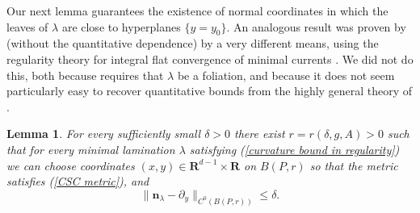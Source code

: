 \documentclass[reqno,11pt]{amsart}
\newcommand{\RR}{\mathbf{R}}
\newcommand{\normal}{\mathbf n}
\newtheorem{lemma}[theorem]{Lemma}
\theoremstyle{definition}
\numberwithin{equation}{section}
\begin{document}
Our next lemma guarantees the existence of normal coordinates in which the leaves of $\lambda$ are close to hyperplanes $\{y = y_0\}$.
An analogous result was proven by \cite{Solomon86} (without the quantitative dependence) by a very different means, using the regularity theory for integral flat convergence of minimal currents \cite[Theorem 5.3.14]{federer2014geometric}.
We did not do this, both because \cite{Solomon86} requires that $\lambda$ be a foliation, and because it does not seem particularly easy to recover quantitative bounds from the highly general theory of \cite[Chapter 5]{federer2014geometric}.

\begin{lemma}\label{lams have C0 fields}
	For every sufficiently small $\delta > 0$ there exist $r = r(\delta, g, A) > 0$ such that for every minimal lamination $\lambda$ satisfying (\ref{curvature bound in regularity}) we can choose coordinates $(x, y) \in \RR^{d - 1} \times \RR$ on $B(P, r)$ so that the metric satisfies (\ref{CSC metric}), and
\begin{equation}\label{normal is basically dy}
	\|\normal_\lambda - \partial_y\|_{C^0(B(P, r))} \leq \delta.
\end{equation}
\end{lemma}
\end{document}
